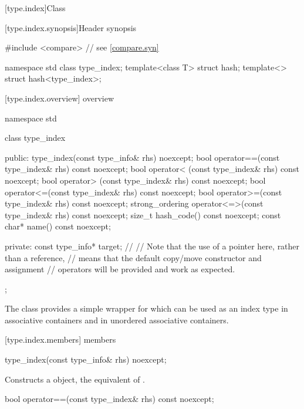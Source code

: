 [type.index]{Class }

[type.index.synopsis]{Header  synopsis}

%
\begin{codeblock}
#include <compare>              // see \ref{compare.syn}

namespace std {
  class type_index;
  template<class T> struct hash;
  template<> struct hash<type_index>;
}
\end{codeblock}

[type.index.overview]{ overview}

%
\begin{codeblock}
namespace std {
  class type_index {
  public:
    type_index(const type_info& rhs) noexcept;
    bool operator==(const type_index& rhs) const noexcept;
    bool operator< (const type_index& rhs) const noexcept;
    bool operator> (const type_index& rhs) const noexcept;
    bool operator<=(const type_index& rhs) const noexcept;
    bool operator>=(const type_index& rhs) const noexcept;
    strong_ordering operator<=>(const type_index& rhs) const noexcept;
    size_t hash_code() const noexcept;
    const char* name() const noexcept;

  private:
    const type_info* target;    // \expos
    // Note that the use of a pointer here, rather than a reference,
    // means that the default copy/move constructor and assignment
    // operators will be provided and work as expected.
  };
}
\end{codeblock}

\pnum
The class  provides a simple wrapper for
 which can be used as an index type in associative
containers and in unordered associative
containers.

[type.index.members]{ members}

%
\begin{itemdecl}
type_index(const type_info& rhs) noexcept;
\end{itemdecl}

\begin{itemdescr}
\pnum
\effects
Constructs a  object, the equivalent of .
\end{itemdescr}

%
\begin{itemdecl}
bool operator==(const type_index& rhs) const noexcept;
\end{itemdecl}

